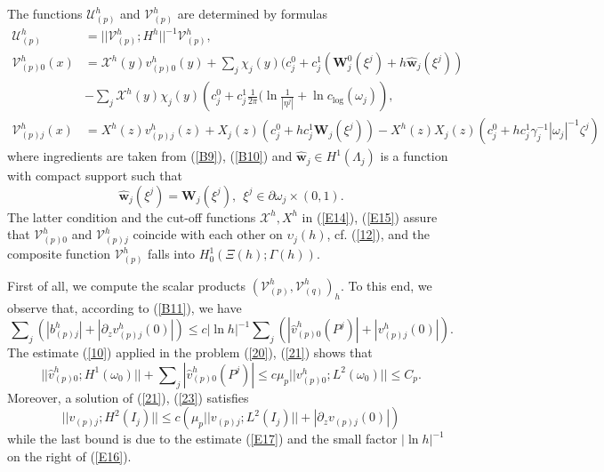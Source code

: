\documentclass[11pt]{article}%
\numberwithin{equation}{section}
\begin{document}
The functions $\mathcal{U}_{(p)}^{h}$ and $\mathcal{V}_{(p)}^{h}$ are
determined by formulas%
\begin{align}
\mathcal{U}_{(p)}^{h}  &  =||\mathcal{V}_{(p)}^{h};H^{h}||^{-1}\mathcal{V}%
_{(p)}^{h},\label{E13}\\
\mathcal{V}_{(p)0}^{h}(x)  &  =\mathcal{X}^{h}(y)v_{(p)0}^{h}(y)+%
{\textstyle\sum\nolimits_{j}}
\chi_{j}(y)(c_{j}^{0}+c_{j}^{1}(\mathbf{W}_{j}^{0}(\xi^{j})+h\widehat
{\mathbf{w}}_{j}(\xi^{j}))\label{E14}\\
&  -%
{\textstyle\sum\nolimits_{j}}
\mathcal{X}^{h}(y)\chi_{j}(y)\left(  c_{j}^{0}+c_{j}^{1}\frac{1}{2\pi}%
(\ln\frac{1}{|\eta^{j}|}+\ln c_{\log}(\omega_{j})\right)  ,\nonumber\\
\mathcal{V}_{(p)j}^{h}(x)  &  =X^{h}(z)v_{(p)j}^{h}(z)+X_{j}(z)(c_{j}%
^{0}+hc_{j}^{1}\mathbf{W}_{j}(\xi^{j}))-X^{h}(z)X_{j}(z)(c_{j}^{0}+hc_{j}%
^{1}\gamma_{j}^{-1}|\omega_{j}|^{-1}\zeta^{j}) \label{E15}%
\end{align}
where ingredients are taken from (\ref{B9}), (\ref{B10}) and $\widehat
{\mathbf{w}}_{j}\in H^{1}(\Lambda_{j})$ is a function with compact support
such that%
\begin{equation}
\widehat{\mathbf{w}}_{j}(\xi^{j})=\mathbf{W}_{j}(\xi^{j}),\ \ \xi^{j}%
\in\partial\omega_{j}\times(0,1). \label{wwj}%
\end{equation}
The latter condition and the cut-off functions $\mathcal{X}^{h},X^{h}$ in
(\ref{E14}), (\ref{E15}) assure that $\mathcal{V}_{(p)0}^{h}$ and
$\mathcal{V}_{(p)j}^{h}$ coincide with each other on $\upsilon_{j}(h)$, cf.
(\ref{12}), and the composite function $\mathcal{V}_{(p)}^{h}$ falls into
$H_{0}^{1}(\Xi(h);\Gamma(h)).$

First of all, we compute the scalar products $(\mathcal{V}_{(p)}%
^{h},\mathcal{V}_{(q)}^{h})_{h}$. To this end, we observe that, according to
(\ref{B11}), we have
\begin{equation}%
{\textstyle\sum\nolimits_{j}}
(|b_{(p)j}^{h}|+|\partial_{z}v_{(p)j}^{h}(0)|)\leq c|\ln h|^{-1}%
{\textstyle\sum\nolimits_{j}}
(|\widehat{v}_{(p)0}^{h}(P^{j})|+|v_{(p)j}^{h}(0)|). \label{E16}%
\end{equation}
The estimate (\ref{10}) applied in the problem (\ref{20}), (\ref{21}) shows
that%
\begin{equation}
||\widehat{v}_{(p)0}^{h};H^{1}(\omega_{0})||+%
{\textstyle\sum\nolimits_{j}}
|\widehat{v}_{(p)0}^{h}(P^{j})|\leq c\mu_{p}||v_{(p)0}^{h};L^{2}(\omega
_{0})||\leq C_{p}. \label{E17}%
\end{equation}
Moreover, a solution of (\ref{21}), (\ref{23}) satisfies%
\begin{equation}
||v_{(p)j};H^{2}(I_{j})||\leq c(\mu_{p}||v_{(p)j};L^{2}(I_{j})||+|\partial
_{z}v_{(p)j}(0)|) \label{E18}%
\end{equation}
while the last bound is due to the estimate (\ref{E17}) and the small factor
$|\ln h|^{-1}$ on the right of (\ref{E16}).
\end{document}
